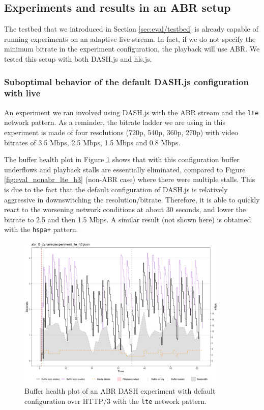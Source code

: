 \subsection{Experiments and results in an ABR setup}
\label{sec:eval/abr}

The testbed that we introduced in Section \ref{sec:eval/testbed} is already capable of running experiments on an adaptive live stream. In fact, if we do not specify the minimum bitrate in the experiment configuration, the playback will use ABR. We tested this setup with both DASH.js and hls.js.

\subsubsection{Suboptimal behavior of the default DASH.js configuration with live}
\label{sec:eval/abr/dashjs}

An experiment we ran involved using DASH.js with the ABR stream and the \texttt{lte} network pattern. As a reminder, the bitrate ladder we are using in this experiment is made of four resolutions (720p, 540p, 360p, 270p) with video bitrates of 3.5 Mbps, 2.5 Mbps, 1.5 Mbps and 0.8 Mbps.

The buffer health plot in Figure \ref{fig:eval_abr_dashjs} shows that with this configuration buffer underflows and playback stalls are essentially eliminated, compared to Figure \ref{fig:eval_nonabr_lte_h3} (non-ABR case) where there were multiple stalls. This is due to the fact that the default configuration of DASH.js is relatively aggressive in downswitching the resolution/bitrate. Therefore, it is able to quickly react to the worsening network conditions at about 30 seconds, and lower the bitrate to 2.5 and then 1.5 Mbps. A similar result (not shown here) is obtained with the \texttt{hspa+} pattern.

\begin{figure}[h]
    \centering
    \includegraphics[width=0.9\textwidth]{res/eval_abr_dash_dynamic.png}
    \caption{Buffer health plot of an ABR DASH experiment with default configuration over HTTP/3 with the \texttt{lte} network pattern.}
    \label{fig:eval_abr_dashjs}
\end{figure}


